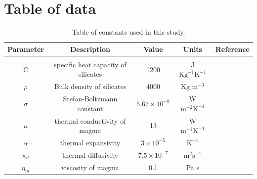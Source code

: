 \documentclass[fleqn,usenatbib]{mnras}
\begin{document}


\appendix

\section{Table of data}

\begin{table}\centering
  \begin{tabular}{c c c c c}
   \hline
    Parameter & Description & Value & Units & Reference  \\ 
     \hline
    \\
  
    $\mathrm{C}$ & specific heat capacity of silicates & 1200 & J $\mathrm{Kg}^{-1} \mathrm{K}^{-1}$ & \cite{Sc2016}   \\
    $\rho$ & Bulk density of silicates & 4000 & Kg $\mathrm{m}^{-3}$ & \cite{Leb2013}  \\
    $\sigma$ & Stefan-Boltzmann constant & $5.67 \times 10^{-8}$ & W $\mathrm{m}^{-2} \mathrm{K}^{-4}$ \\
    $\kappa$ & thermal conductivity of magma & 13 & W $\mathrm{m}^{-1} \mathrm{K}^{-1}$ & \cite{Ohta2017} \\ 
    $\alpha$ & thermal expansivity & $3 \times 10^{-5}$ & $\mathrm{K}^{-1}$ & \cite{Tach2011} \\
    $\kappa_{d}$ & thermal diffusivity & $7.5 \times 10^{-7}$ & $\mathrm{m}^{2} \mathrm{s}^{-1}$ & \cite{Sc2016} \\
    $\eta_{m}$ & viscosity of magma & 0.1 & Pa s & \cite{Boukare2023} \\
    
     \hline
  \end{tabular}
  \label{tab1}
  \caption{Table of constants used in this study.}
   
\end{table}



\bsp	%
\label{lastpage}
\end{document}

